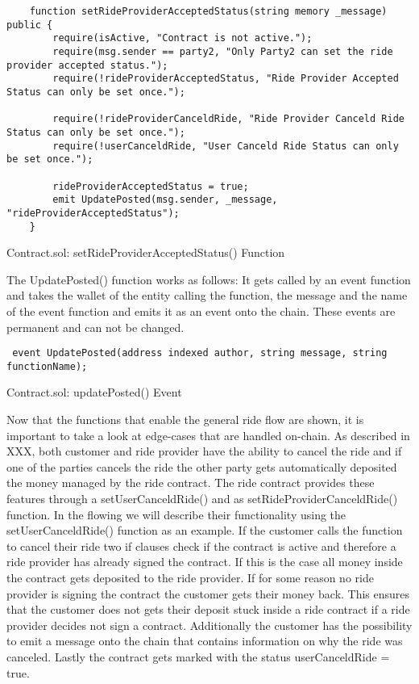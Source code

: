 \lstset{
  basicstyle=\footnotesize\ttfamily,
  breaklines=true,
  numbers=left,
  firstnumber=97
}
\begin{Listing}
\begin{lstlisting}
    function setRideProviderAcceptedStatus(string memory _message) public {
        require(isActive, "Contract is not active.");
        require(msg.sender == party2, "Only Party2 can set the ride provider accepted status.");
        require(!rideProviderAcceptedStatus, "Ride Provider Accepted Status can only be set once.");

        require(!rideProviderCanceldRide, "Ride Provider Canceld Ride Status can only be set once.");
        require(!userCanceldRide, "User Canceld Ride Status can only be set once.");

        rideProviderAcceptedStatus = true;
        emit UpdatePosted(msg.sender, _message, "rideProviderAcceptedStatus");
    }
\end{lstlisting}
  \caption{Contract.sol: setRideProviderAcceptedStatus() Function}
  \label{lst:signContract}
\end{Listing}

The UpdatePosted() function works as follows: It gets called by an event function and takes the wallet of the entity calling the function, the message and the name of the event function and emits it as an event onto the chain. These events are permanent and can not be changed.

\lstset{
  basicstyle=\footnotesize\ttfamily,
  breaklines=true,
  numbers=left,
  firstnumber=94
}

\begin{Listing}
\begin{lstlisting}
 event UpdatePosted(address indexed author, string message, string functionName);
\end{lstlisting}
  \caption{Contract.sol: updatePosted() Event}
  \label{lst:updatePosted}
\end{Listing}

Now that the functions that enable the general ride flow are shown, it is important to take a look at edge-cases that are handled on-chain. As described in XXX, both customer and ride provider have the ability to cancel the ride and if one of the parties cancels the ride the other party gets automatically deposited the money managed by the ride contract. The ride contract provides these features through a setUserCanceldRide() and as setRideProviderCanceldRide() function. In the flowing we will describe their functionality using the setUserCanceldRide() function as an example. If the customer calls the function to cancel their ride two if clauses check if the contract is active and therefore a ride provider has already signed the contract. If this is the case all money inside the contract gets deposited to the ride provider. If for some reason no ride provider is signing the contract the customer gets their money back. This ensures that the customer does not gets their deposit stuck inside a ride contract if a ride provider decides not sign a contract. Additionally the customer has the possibility to emit a message onto the chain that contains information on why the ride was canceled.
Lastly the contract gets marked with the status userCanceldRide = true.

